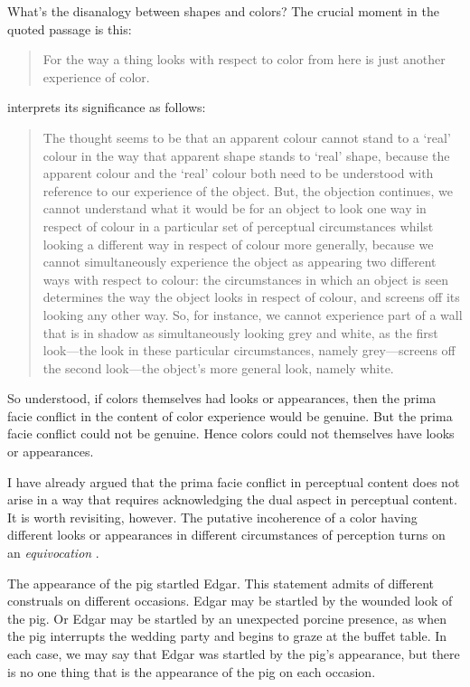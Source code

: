 \documentclass[12pt]{article}
\begin{document}
What's the disanalogy between shapes and colors? The crucial moment in the quoted passage is this:
	\begin{quote}
		For the way a thing looks with respect to color from here is just another experience of color. \citep[133]{Noe:2004fk}
	\end{quote}
\citet{Allen:2008kx} interprets its significance as follows:
	\begin{quote}
		The thought seems to be that an apparent colour cannot stand to a ‘real’ colour in the way that apparent shape stands to ‘real’ shape, because the apparent colour and the ‘real’ colour both need to be understood with reference to our experience of the object. But, the objection continues, we cannot understand what it would be for an object to look one way in respect of colour in a particular set of perceptual circumstances whilst looking a different way in respect of colour more generally, because we cannot simultaneously experience the object as appearing two different ways with respect to colour: the circumstances in which an object is seen determines the way the object looks in respect of colour, and screens off its looking any other way. So, for instance, we cannot experience part of a wall that is in shadow as simultaneously looking grey and white, as the first look---the look in these particular circumstances, namely grey---screens off the second look---the object’s more general look, namely white.
	\end{quote}
So understood, if colors themselves had looks or appearances, then the prima facie conflict in the content of color experience would be genuine. But the prima facie conflict could not be genuine. Hence colors could not themselves have looks or appearances.

I have already argued that the prima facie conflict in perceptual content does not arise in a way that requires acknowledging the dual aspect in perceptual content. It is worth revisiting, however. The putative incoherence of a color having different looks or appearances in different circumstances of perception turns on an \emph{equivocation} \citep[though I develop the point in a different way, the present point is essentially due to][48]{Chisholm:1957dq}. 

The appearance of the pig startled Edgar. This statement admits of different construals on different occasions. Edgar may be startled by the wounded look of the pig. Or Edgar may be startled by an unexpected porcine presence, as when the pig interrupts the wedding party and begins to graze at the buffet table. In each case, we may say that Edgar was startled by the pig's appearance, but there is no one thing that is the appearance of the pig on each occasion. 
\end{document}
